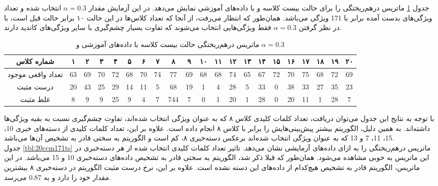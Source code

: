 \documentclass[11.5pt,a4paper]{article}
\begin{document}
جدول 
\ref{tbl:20ccm171tr}
ماتریس درهم‌ریختگی را برای حالت بیست کلاسه و با داده‌های آموزشی نمایش می‌دهد. در این آزمایش مقدار $\alpha = 0.3$ انتخاب شده و تعداد ویژگی‌های بدست آمده برابر با 171 ویژگی می‌باشد. همان‌طور که انتظار می‌رفت، از آنجا که تعداد کلاس‌ها در این حالت ۱۰ برابر حالت قبل است،‌ با در نظر گرفتن $\alpha = 0.3$ فقط ویژگی‌هایی انتخاب می‌شوند که تفاوت بسیار چشم‌گیری با سایر ویژگی‌های کاندید دارند. 
\\
\begin{table}[h]
\center
\caption{ماتریس درهم‌ریختگی حالت بیست کلاسه با داده‌های آموزشی و $\alpha = 0.3$}
\label{tbl:20ccm171tr}
\begin{tabular}{c | c | c | c | c | c | c | c | c | c | c | c | c | c | c | c | c | c | c | c | c }
  شماره کلاس & ۱ & ۲ & ۳ & ۴ & ۵ & ۶ & ۷ & ۸ & ۹ & ۱۰ & ۱۱ & ۱۲ & ۱۳ & ۱۴ & ۱۵ & ۱۶ & ۱۷ & ۱۸ & ۱۹ & ۲۰ \\
\hline
\hline
تعداد واقعی موجود& 63  & 69   &  70  &  72  &  68  &  70  &  74  &  77  &  69  &  68  & 68   &  74  &  65  &  67  &  72  &  70  &  75  &  68  &  72  &  69  \\
درست مثبت& 20  &  43  &  25  &  29  &  14  &  11  &  5  &  68  &  19  &  1  &  4  &  28  & 5   &  33  &  0  &  38  &  33  &  27  &  35  &  23  \\
غلط مثبت& 8  &  9  &  9  &  25  &  9  &  4  &  7  &  744  &  7  &  0  &  1  &  20  &  1  & 28   &  0  & 20  &  11  &  1  &  28  &  7  \\
\end{tabular}
\end{table}

با توجه به نتایج این جدول می‌توان دریافت، تعداد کلمات کلیدی کلاس ۸ که به عنوان ویژگی انتخاب شده‌اند، تفاوت چشم‌گیری نسبت به بقیه ویژگی‌ها داشته‌اند. به همین دلیل، الگوریتم بیشتر پیش‌بینی‌هایش را برابر با کلاس ۸ انجام داده است. علاوه بر این،
تعداد کلمات کلیدی از دسته‌های‌ خبری 10، 15، 11، 7 و 13 که به عنوان ویژگی انتخاب شده‌اند برعکس دسته‌خبری ۸، کم است و الگوریتم به سختی قادر به تشخیص آن‌ها می‌باشد.
\\

جدول
\ref{tbl:20ccm171ts}
ماتریس درهم‌ریختگی را به ازای داده‌های آزمایشی نشان می‌دهد. تاثیر تعداد کلمات کلیدی انتخاب شده از هر دسته‌خبری در این ماتریس به خوبی مشاهده می‌شود. همان‌طور که قبلا ذکر شد، الگوریتم به سختی قادر به تشخیص داده‌های دسته‌خبری 10 و 15 می‌باشد. در این ماتریس، الگوریتم قادر به تشخیص هیچ‌کدام از داده‌های این دسته نشده است. علاوه بر این، نرخ درست مثبت الگوریتم در دسته‌خبری ۸ بیشترین مقدار خود را دارد و به 0.87 می‌رسد.
\end{document}
